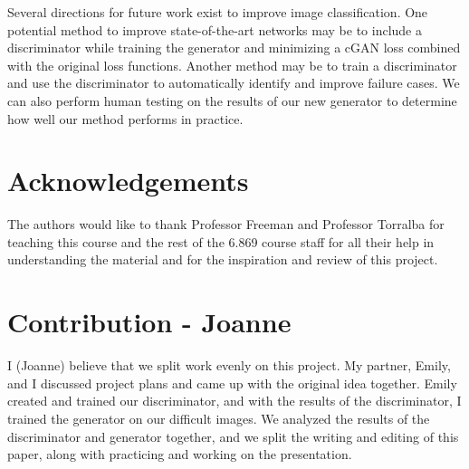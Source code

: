 \documentclass[10pt,twocolumn,letterpaper]{article}
\begin{document}
Several directions for future work exist to improve image classification. One potential method to improve state-of-the-art networks may be to include a discriminator while training the generator and minimizing a cGAN loss combined with the original loss functions. Another method may be to train a discriminator and use the discriminator to automatically identify and improve failure cases. We can also perform human testing on the results of our new generator to determine how well our method performs in practice.

\section{Acknowledgements}

The authors would like to thank Professor Freeman and Professor Torralba for teaching this course and the rest of the 6.869 course staff for all their help in understanding the material and for the inspiration and review of this project.

\section{Contribution - Joanne}

I (Joanne) believe that we split work evenly on this project. My partner, Emily, and I discussed project plans and came up with the original idea together. Emily created and trained our discriminator, and with the results of the discriminator, I trained the generator on our difficult images. We analyzed the results of the discriminator and generator together, and we split the writing and editing of this paper, along with practicing and working on the presentation. 
\end{document}
